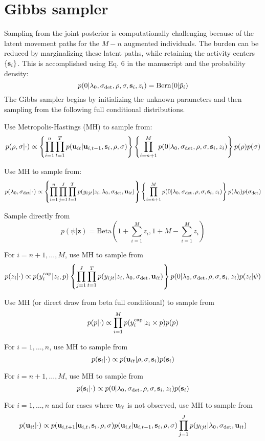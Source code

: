 \documentclass[12pt]{article}
\newcommand{\bsi}{{\bf s}_i}
\newcommand{\bu}{{\bf u}}
\newcommand{\buit}{{\bf u}_{it}}
\begin{document}
\clearpage

\section*{Gibbs sampler}

Sampling from the joint posterior is computationally challenging
because of the latent movement paths for the $M-n$ augmented
individuals. The burden can be reduced by marginalizing these latent
paths, while retaining the activity centers $\{\bsi\}$. This is
accomplished using Eq. 6 in the manuscript and the probability density:
\[
  p(0|\lambda_0,\sigma_{\rm det},\rho,\sigma,\bsi,z_i) = \mathrm{Bern}(0|\tilde{p}_i)
\]
The Gibbs sampler begins by initializing the unknown parameters and
then sampling from the following full conditional distributions.

Use Metropolis-Hastings (MH) to sample from:
\[
  p(\rho,\sigma|\cdot) \propto \left\{\prod_{i=1}^n\prod_{t=1}^T
    p(\buit|\bu_{i,t-1},\bsi,\rho,\sigma)\right\}\left\{\prod_{i=n+1}^M p(0|\lambda_0,\sigma_{\rm det},\rho,\sigma,\bsi,z_i)\right\}p(\rho)p(\sigma)
\]

Use MH to sample from:
\[
  p(\lambda_0,\sigma_{\rm det}|\cdot) \propto \left\{\prod_{i=1}^n\prod_{j=1}^J\prod_{t=1}^T
    p(y_{ijt}|z_i,\lambda_0,\sigma_{\rm det},\buit)\right\}\left\{\prod_{i=n+1}^M
    p(0|\lambda_0,\sigma_{\rm det},\rho,\sigma,\bsi,z_i)\right\}p(\lambda_0)p(\sigma_{\rm det})
\]

Sample directly from
\[
  p(\psi|{\bm z}) = \mathrm{Beta}\left(1+\sum_{i=1}^M z_i, 1+M-\sum_{i=1}^M z_i\right)
\]

For $i=n+1,\dots,M$, use MH to sample from
\[
  p(z_i|\cdot) \propto p(y^{\rm cap}_i|z_i,p)
    \left\{\prod_{j=1}^J\prod_{t=1}^T p(y_{ijt}|z_i,\lambda_0,\sigma_{\rm
      det},\buit)\right\}
  p(0|\lambda_0,\sigma_{\rm det},\rho,\sigma,\bsi,z_i)p(z_i|\psi)
\]

Use MH (or direct draw from beta full conditional) to sample from
\[
  p(p|\cdot) \propto \prod_{i=1}^M p(y^{\rm cap}_i|z_i \times p)p(p)
\]

For $i=1,\dots,n$, use MH to sample from
\[
  p(\bsi|\cdot) \propto p(\buit|\rho,\sigma,\bsi)p(\bsi)
\]

For $i=n+1,\dots,M$, use MH to sample from
\[
  p(\bsi|\cdot) \propto p(0|\lambda_0,\sigma_{\rm det},\rho,\sigma,\bsi,z_i)p(\bsi)
\]

For $i=1,\dots,n$ and for cases where $\buit$ is not observed, use MH to sample from
\[
  p(\buit|\cdot) \propto
  p(\bu_{i,t+1}|\bu_{i,t},\bsi,\rho,\sigma)p(\bu_{i,t}|\bu_{i,t-1},\bsi,\rho,\sigma)\prod_{j=1}^J
  p(y_{ijt}|\lambda_0,\sigma_{\rm det},\buit)
\]
\end{document}
